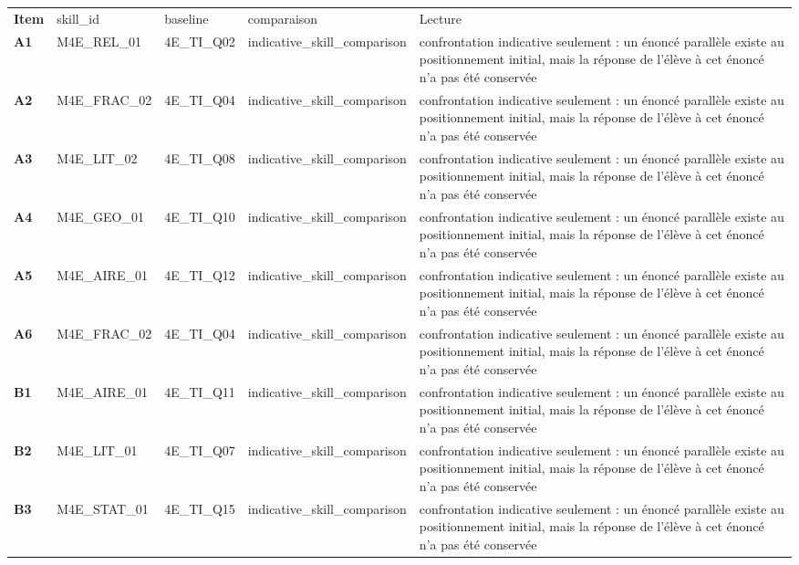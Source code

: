 \documentclass[10pt,a4paper]{article}
\begin{document}
\par\noindent\begin{tabularx}{\linewidth}{>{\bfseries}p{9mm} >{\ttfamily\scriptsize}p{25mm} >{\ttfamily\scriptsize}p{22mm} >{\ttfamily\scriptsize}p{16mm} X}
\rowcolor{Navy}\color{white}Item & \color{white}\scriptsize skill\_id & \color{white}\scriptsize baseline & \color{white}\scriptsize comparaison & \color{white}Lecture \\
A1 & M4E\_REL\_01 & 4E\_TI\_Q02 & indicative\_skill\_comparison & confrontation indicative seulement : un énoncé parallèle existe au positionnement initial, mais la réponse de l'élève à cet énoncé n'a pas été conservée \\
A2 & M4E\_FRAC\_02 & 4E\_TI\_Q04 & indicative\_skill\_comparison & confrontation indicative seulement : un énoncé parallèle existe au positionnement initial, mais la réponse de l'élève à cet énoncé n'a pas été conservée \\
A3 & M4E\_LIT\_02 & 4E\_TI\_Q08 & indicative\_skill\_comparison & confrontation indicative seulement : un énoncé parallèle existe au positionnement initial, mais la réponse de l'élève à cet énoncé n'a pas été conservée \\
A4 & M4E\_GEO\_01 & 4E\_TI\_Q10 & indicative\_skill\_comparison & confrontation indicative seulement : un énoncé parallèle existe au positionnement initial, mais la réponse de l'élève à cet énoncé n'a pas été conservée \\
A5 & M4E\_AIRE\_01 & 4E\_TI\_Q12 & indicative\_skill\_comparison & confrontation indicative seulement : un énoncé parallèle existe au positionnement initial, mais la réponse de l'élève à cet énoncé n'a pas été conservée \\
A6 & M4E\_FRAC\_02 & 4E\_TI\_Q04 & indicative\_skill\_comparison & confrontation indicative seulement : un énoncé parallèle existe au positionnement initial, mais la réponse de l'élève à cet énoncé n'a pas été conservée \\
B1 & M4E\_AIRE\_01 & 4E\_TI\_Q11 & indicative\_skill\_comparison & confrontation indicative seulement : un énoncé parallèle existe au positionnement initial, mais la réponse de l'élève à cet énoncé n'a pas été conservée \\
B2 & M4E\_LIT\_01 & 4E\_TI\_Q07 & indicative\_skill\_comparison & confrontation indicative seulement : un énoncé parallèle existe au positionnement initial, mais la réponse de l'élève à cet énoncé n'a pas été conservée \\
B3 & M4E\_STAT\_01 & 4E\_TI\_Q15 & indicative\_skill\_comparison & confrontation indicative seulement : un énoncé parallèle existe au positionnement initial, mais la réponse de l'élève à cet énoncé n'a pas été conservée \\

\end{tabularx}
\end{document}
